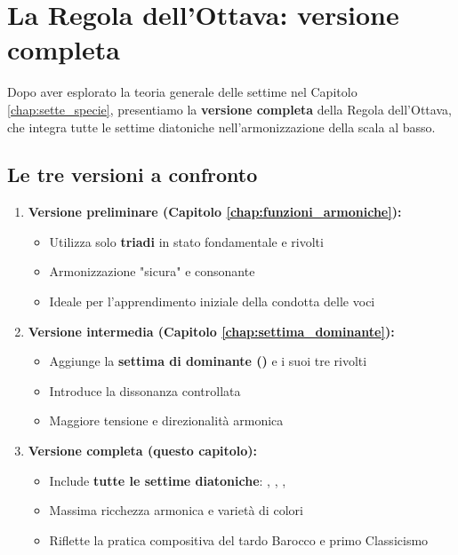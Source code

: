 \chapter{La Regola dell'Ottava: versione completa}
\label{chap:regola_ottava_completa}

Dopo aver esplorato la teoria generale delle settime nel Capitolo \ref{chap:sette_specie}, presentiamo la \textbf{versione completa} della Regola dell'Ottava, che integra tutte le settime diatoniche nell'armonizzazione della scala al basso.

\section{Le tre versioni a confronto}
\label{sec:tre_versioni_confronto}

\begin{definizione}
	\label{def:tre_versioni_complete}
	
	\begin{enumerate}
		\item \textbf{Versione preliminare (Capitolo \ref{chap:funzioni_armoniche}):}
		\begin{itemize}
			\item Utilizza solo \textbf{triadi} in stato fondamentale e rivolti
			\item Armonizzazione "sicura" e consonante
			\item Ideale per l'apprendimento iniziale della condotta delle voci
		\end{itemize}
		
		\item \textbf{Versione intermedia (Capitolo \ref{chap:settima_dominante}):}
		\begin{itemize}
			\item Aggiunge la \textbf{settima di dominante ()} e i suoi tre rivolti
			\item Introduce la dissonanza controllata
			\item Maggiore tensione e direzionalità armonica
		\end{itemize}
		
		\item \textbf{Versione completa (questo capitolo):}
		\begin{itemize}
			\item Include \textbf{tutte le settime diatoniche}: , , , 
			\item Massima ricchezza armonica e varietà di colori
			\item Riflette la pratica compositiva del tardo Barocco e primo Classicismo
		\end{itemize}
	\end{enumerate}
\end{definizione}

